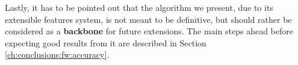 Lastly, it has to be pointed out that the algorithm we present, due to its extensible features system, is not meant to be definitive, but should rather be considered as a \textbf{backbone} for future extensions. The main steps ahead before expecting good results from it are described in Section \ref{ch:conclusions:fw:accuracy}.






